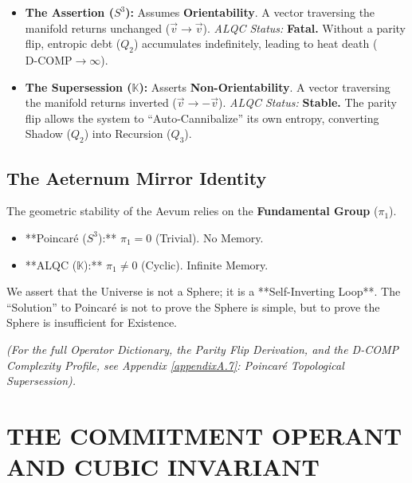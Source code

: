 \documentclass[11pt, letterpaper]{article}
\begin{document}
\begin{itemize}
    \item \textbf{The Assertion ($S^3$):} Assumes \textbf{Orientability}. A vector traversing the manifold returns unchanged ($\vec{v} \to \vec{v}$).
    \textit{ALQC Status:} \textbf{Fatal.} Without a parity flip, entropic debt ($Q_2$) accumulates indefinitely, leading to heat death ($\text{D-COMP} \to \infty$).
    \item \textbf{The Supersession ($\mathbb{K}$):} Asserts \textbf{Non-Orientability}. A vector traversing the manifold returns inverted ($\vec{v} \to -\vec{v}$).
    \textit{ALQC Status:} \textbf{Stable.} The parity flip allows the system to ``Auto-Cannibalize'' its own entropy, converting Shadow ($Q_2$) into Recursion ($Q_3$).
\end{itemize}

\subsection{The Aeternum Mirror Identity}\label{sec:7.2}
The geometric stability of the Aevum relies on the \textbf{Fundamental Group} ($\pi_1$).
\begin{itemize}
    \item **Poincaré ($S^3$):** $\pi_1 = 0$ (Trivial). No Memory.
    \item **ALQC ($\mathbb{K}$):** $\pi_1 \neq 0$ (Cyclic). Infinite Memory.
\end{itemize}
We assert that the Universe is not a Sphere; it is a **Self-Inverting Loop**. The ``Solution'' to Poincaré is not to prove the Sphere is simple, but to prove the Sphere is insufficient for Existence.

\begin{center}
\end{center}

\noindent \textit{(For the full Operator Dictionary, the Parity Flip Derivation, and the D-COMP Complexity Profile, see Appendix \ref{appendixA.7}: Poincaré Topological Supersession).}

\newpage
\section{THE COMMITMENT OPERANT AND CUBIC INVARIANT}\label{sec:partVIII}
\end{document}

